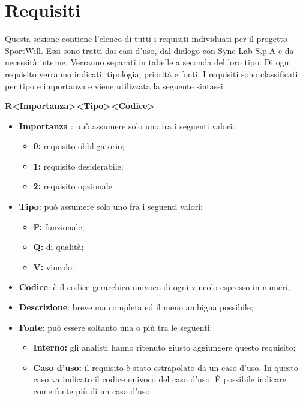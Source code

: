 \section{Requisiti}

Questa sezione contiene l'elenco di tutti i requisiti individuati per il progetto SportWill. Essi sono tratti dai casi d’uso, dal dialogo con Sync Lab S.p.A e da necessità interne. Verranno separati in tabelle a seconda del loro tipo. Di ogni requisito verranno indicati: tipologia, priorità e fonti. I requisiti sono classificati per tipo e importanza e viene utilizzata la seguente sintassi:
\begin{center}
\textbf{R<Importanza><Tipo><Codice>}    
\end{center}
\begin{itemize}
    \item \textbf{Importanza} : può assumere solo uno fra i seguenti valori:
    \begin{itemize}
        \item \textbf{0:} requisito obbligatorio;
        \item \textbf{1:} requisito desiderabile;
        \item \textbf{2:} requisito opzionale.
    \end{itemize}
    \item \textbf{Tipo}: può assumere solo uno fra i seguenti valori:
    \begin{itemize}
        \item \textbf{F:} funzionale;
        \item \textbf{Q:} di qualità;
        \item \textbf{V:} vincolo.
    \end{itemize}
    \item \textbf{Codice}: è il codice gerarchico univoco di ogni vincolo espresso in numeri;
    \item \textbf{Descrizione}: breve ma completa ed il meno ambigua possibile;
    \item \textbf{Fonte}: può essere soltanto una o più tra le seguenti:
    \begin{itemize}
        \item \textbf{Interno:} gli analisti hanno ritenuto giusto aggiungere questo requisito;
        \item \textbf{Caso d’uso:} il requisito è stato estrapolato da un caso d’uso. In questo caso va indicato il codice univoco del caso d’uso. È possibile indicare come fonte più di un caso d’uso.
    \end{itemize}

\end{itemize}
